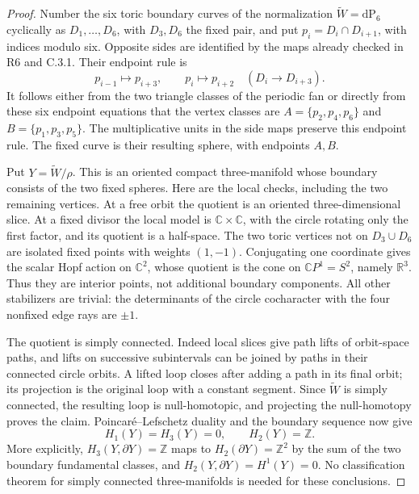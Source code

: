 \begin{proof}
Number the six toric boundary curves of the normalization
\(\widetilde W=\mathrm{dP}_6\) cyclically as
\(D_1,\ldots,D_6\), with \(D_3,D_6\) the fixed pair, and put
\(p_i=D_i\cap D_{i+1}\), with indices modulo six. Opposite sides
are identified by the maps already checked in R6 and C.3.1.
Their endpoint rule is
\[
 p_{i-1}\longmapsto p_{i+3},\qquad
 p_i\longmapsto p_{i+2}\quad(D_i\longrightarrow D_{i+3}).
\]
It follows either from the two triangle classes of the periodic
fan or directly from these six endpoint equations that the vertex
classes are
\(A=\{p_2,p_4,p_6\}\) and \(B=\{p_1,p_3,p_5\}\).
The multiplicative units in the side maps preserve this endpoint
rule. The fixed curve is their resulting sphere, with endpoints
\(A,B\).

Put \(Y=\widetilde W/\rho\). This is an oriented compact
three-manifold whose boundary consists of the two fixed spheres.
Here are the local checks, including the two remaining vertices.
At a free orbit the quotient is an oriented three-dimensional
slice. At a fixed divisor the local model is
\(\mathbb C\times\mathbb C\), with the circle rotating only
the first factor, and its quotient is a half-space. The two toric
vertices not on \(D_3\cup D_6\) are isolated fixed points with
weights \((1,-1)\). Conjugating one coordinate gives the scalar
Hopf action on \(\mathbb C^2\), whose quotient is the cone on
\(\mathbb CP^1=S^2\), namely \(\mathbb R^3\). Thus they are
interior points, not additional boundary components.
All other stabilizers are trivial: the determinants of the circle
cocharacter with the four nonfixed edge rays are \(\pm1\).

The quotient is simply connected. Indeed local slices give path
lifts of orbit-space paths, and lifts on successive subintervals
can be joined by paths in their connected circle orbits. A lifted
loop closes after adding a path in its final orbit; its projection
is the original loop with a constant segment. Since
\(\widetilde W\) is simply connected, the resulting loop is
null-homotopic, and projecting the null-homotopy proves the claim.
Poincar\'e--Lefschetz duality and the boundary sequence now give
\[
 H_1(Y)=H_3(Y)=0,\qquad H_2(Y)=\mathbb Z.
\]
More explicitly, \(H_3(Y,\partial Y)=\mathbb Z\) maps to
\(H_2(\partial Y)=\mathbb Z^2\) by the sum of the two boundary
fundamental classes, and \(H_2(Y,\partial Y)=H^1(Y)=0\).
No classification theorem for simply connected three-manifolds
is needed for these conclusions.


\end{proof}
